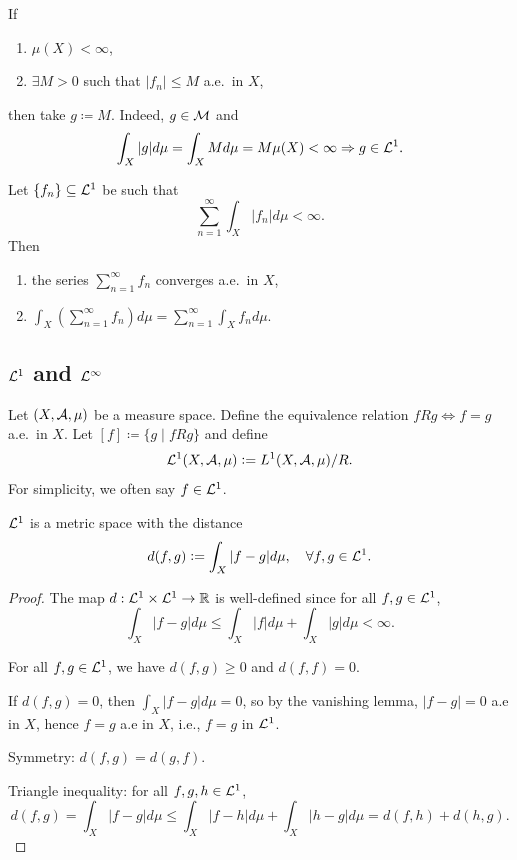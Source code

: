 \begin{remark}
If
\begin{enumerate}
    \item $\mu(X) < \infty$,
    \item $\exists M > 0$ such that $|f_n| \leq M$ a.e.\ in $X$,
\end{enumerate}
then take $g \coloneqq M$. Indeed, $g \in \mathcal{M}$ and
\[
\int_X |g|  d\mu = \int_X M  d\mu = M \mu(X) < \infty \Rightarrow g \in \mathcal{L}^1.
\]
\end{remark}

\begin{theorem}
Let $\{f_n\} \subseteq \mathcal{L}^1$ be such that
\[
\sum_{n=1}^\infty \int_X |f_n|  d\mu < \infty.
\]
Then
\begin{enumerate}
    \item the series $\sum_{n=1}^\infty f_n$ converges a.e.\ in $X$,
    \item $\int_X \left( \sum_{n=1}^\infty f_n \right) d\mu = \sum_{n=1}^\infty \int_X f_n  d\mu$.
\end{enumerate}
\end{theorem}

\subsection{$\mathcal{L}^1$ and $\mathcal{L}^\infty$}

Let $(X, \mathcal{A}, \mu)$ be a measure space. Define the equivalence relation $f R g \iff f = g$ a.e.\ in $X$. Let $[f] \coloneqq \{ g \mid f R g \}$ and define
\[
\mathcal{L}^1(X, \mathcal{A}, \mu) \mathrel{\mathop:}= L^1(X, \mathcal{A}, \mu) / R.
\]
For simplicity, we often say $f \in \mathcal{L}^1$.

\begin{lemma}
$\mathcal{L}^1$ is a metric space with the distance
\[
d(f, g) \mathrel{\mathop:}= \int_X |f - g|  d\mu, \quad \forall f, g \in \mathcal{L}^1.
\]
\end{lemma}

\begin{proof}
The map $d : \mathcal{L}^1 \times \mathcal{L}^1 \to \mathbb{R}$ is well-defined since for all $f, g \in \mathcal{L}^1$,
\[
\int_X |f - g|  d\mu \leq \int_X |f|  d\mu + \int_X |g|  d\mu < \infty.
\]

For all $f, g \in \mathcal{L}^1$, we have $d(f, g) \geq 0$ and $d(f, f) = 0$.

If $d(f, g) = 0$, then $\int_X |f - g|  d\mu = 0$, so by the vanishing lemma, $|f - g| = 0$ a.e in $X$, hence $f = g$ a.e in $X$, i.e., $f = g$ in $\mathcal{L}^1$.

Symmetry: $d(f, g) = d(g, f)$.

Triangle inequality: for all $f, g, h \in \mathcal{L}^1$,
\[
d(f, g) = \int_X |f - g|  d\mu \leq \int_X |f - h|  d\mu + \int_X |h - g|  d\mu = d(f, h) + d(h, g).
\]
\end{proof}

